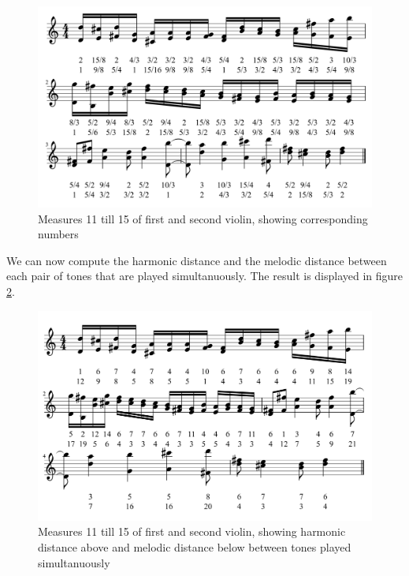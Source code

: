 \documentclass[a4paper]{book}
\theoremstyle{definition}
\begin{document}
\begin{figure}[H]
    \centering
    \includegraphics[scale=0.25]{figures/fig_first_second_violin_tones.png}
    \caption{Measures 11 till 15 of first and second violin, showing corresponding numbers}
    \label{fig_first_second_violin_tones}
\end{figure}

We can now compute the harmonic distance and the melodic distance between each pair of tones that are played simultanuously.
The result is displayed in figure \ref{fig_first_second_violin_melodic_and_harmonic_distance_self}.

\begin{figure}[H]
    \centering
    \includegraphics[scale=0.25]{figures/fig_first_second_violin_melodic_and_harmonic_distance_self.png}
    \caption{Measures 11 till 15 of first and second violin, showing harmonic distance above and melodic distance below between tones played simultanuously}
    \label{fig_first_second_violin_melodic_and_harmonic_distance_self}
\end{figure}
\end{document}
